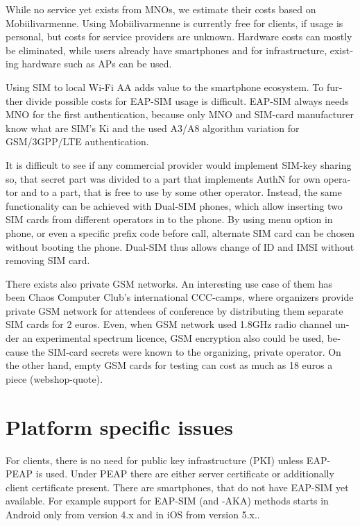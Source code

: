\documentclass[12pt,a4paper,english]{tutthesis}
\begin{document}
\begin{otherlanguage}{english}
While no service yet exists from MNOs, we estimate their costs based
on Mobiilivarmenne. Using Mobiilivarmenne is currently free for
clients, if usage is personal, but costs for service providers are
unknown.  Hardware costs can mostly be eliminated, while users already
have smartphones and for infrastructure, existing hardware such as APs
can be used.

Using SIM to local Wi-Fi AA adds value to the smartphone ecosystem.
To further divide possible costs for EAP-SIM usage
is difficult.
EAP-SIM always needs MNO for the first authentication,
because only MNO and SIM-card manufacturer know 
what are SIM's Ki and the used A3/A8 algorithm variation
for GSM/3GPP/LTE authentication.

It is difficult to see if any commercial provider would implement
SIM-key sharing so, that secret part was divided to a part that
implements AuthN for own operator and to a part, that is free to use by
some other operator.  Instead, the same functionality can be achieved with
Dual-SIM phones, which allow inserting two SIM cards from different
operators in to the phone. By using menu option in phone, or even a
specific prefix code before call, alternate SIM card can be chosen
without booting the phone.
Dual-SIM thus allows change of ID and IMSI without removing SIM card.

There exists also private GSM networks. An interesting use case
of them  has been Chaos Computer Club's international 
CCC-camps\cite{ccc}, where organizers 
provide private GSM network for attendees of conference
by distributing them separate SIM cards for 2 euros.  Even, when GSM
network used 1.8GHz radio channel under an experimental spectrum
licence,  GSM encryption also could be used, because the SIM-card secrets were known
to the organizing, private operator.
On the other hand, empty GSM cards for testing can cost as much as 
18 euros a piece (webshop-quote\cite{smartjac-testsim}).


\section{Platform specific issues}
\label{sec-6-3}

For clients, there is no need for public key infrastructure (PKI)
unless EAP-PEAP is used. Under PEAP there are either server
certificate or additionally client certificate present.  There are
smartphones, that do not have EAP-SIM yet available.  For example
support for EAP-SIM (and -AKA) methods starts in Android only from
version 4.x and in iOS from version 5.x.\cite{sim-support}.


\end{otherlanguage}
\end{document}
